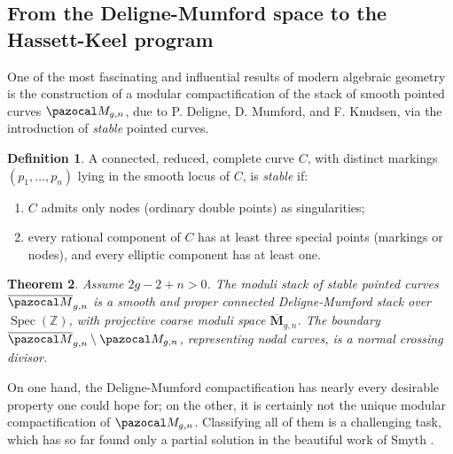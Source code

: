 \documentclass[11pt]{amsart}
\newcommand{\oM}{\overline{\pazocal M}}
\theoremstyle{plain}
\newtheorem{thm}{Theorem}[section]
\theoremstyle{definition}
\newtheorem{dfn}[thm]{Definition}
\begin{document}
\subsection{From the Deligne-Mumford space to the Hassett-Keel program} One of the most fascinating and influential results of modern algebraic geometry is the construction of a modular compactification of the stack of smooth pointed curves $\pazocal M_{g,n}$, due to P. Deligne, D. Mumford, and F. Knudsen, via the introduction of \emph{stable} pointed curves.

\begin{dfn}\cite{DM}
 A connected, reduced, complete curve $C$, with distinct markings $(p_1,\ldots,p_n)$ lying in the smooth locus of $C$, is \emph{stable} if:
 \begin{enumerate}[leftmargin=.7cm]
  \item $C$ admits only nodes (ordinary double points) as singularities;
  \item every rational component of $C$ has at least three special points (markings or nodes), and every elliptic component has at least one.
 \end{enumerate}
\end{dfn}

\begin{thm} \cite{DM,Knudsen}
 Assume $2g-2+n>0$. The moduli stack of stable pointed curves $\oM_{g,n}$ is a smooth and proper connected Deligne-Mumford stack over $\operatorname{Spec}(\mathbb Z)$, with projective coarse moduli space $\overline{\mathbf M}_{g,n}$. The boundary $\oM_{g,n}\setminus\pazocal M_{g,n}$, representing nodal curves, is a normal crossing divisor.
\end{thm}
On one hand, the Deligne-Mumford compactification has nearly every desirable property one could hope for; on the other, it is certainly not the unique modular compactification of $\pazocal M_{g,n}$. Classifying all of them is a challenging task, which has so far found only a partial solution in the beautiful work of Smyth \cite{SMY-towards}.
\end{document}
